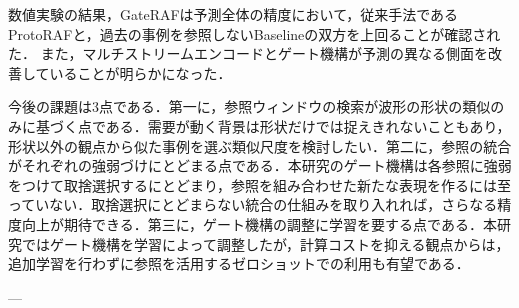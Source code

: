 \documentclass[twocolumn, lastpage]{jarticle}
\begin{document}
数値実験の結果，GateRAFは予測全体の精度において，従来手法であるProtoRAFと，過去の事例を参照しないBaselineの双方を上回ることが確認された．
また，マルチストリームエンコードとゲート機構が予測の異なる側面を改善していることが明らかになった．

今後の課題は3点である．第一に，参照ウィンドウの検索が波形の形状の類似のみに基づく点である．需要が動く背景は形状だけでは捉えきれないこともあり，形状以外の観点から似た事例を選ぶ類似尺度を検討したい．第二に，参照の統合がそれぞれの強弱づけにとどまる点である．本研究のゲート機構は各参照に強弱をつけて取捨選択するにとどまり，参照を組み合わせた新たな表現を作るには至っていない．取捨選択にとどまらない統合の仕組みを取り入れれば，さらなる精度向上が期待できる．第三に，ゲート機構の調整に学習を要する点である．本研究ではゲート機構を学習によって調整したが，計算コストを抑える観点からは，追加学習を行わずに参照を活用するゼロショットでの利用も有望である．

\shaji
---
\end{document}
